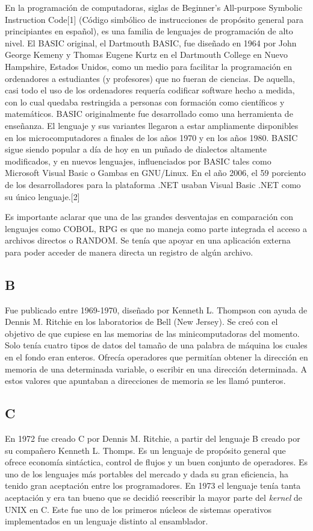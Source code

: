 \documentclass[twoside,twocolumn]{article}
\begin{document}
En la programación de computadoras, siglas de Beginner's All-purpose Symbolic Instruction Code[1] (Código simbólico de instrucciones de propósito general para principiantes en español), es una familia de lenguajes de programación de alto nivel. El BASIC original, el Dartmouth BASIC, fue diseñado en 1964 por John George Kemeny y Thomas Eugene Kurtz en el Dartmouth College en Nuevo Hampshire, Estados Unidos, como un medio para facilitar la programación en ordenadores a estudiantes (y profesores) que no fueran de ciencias. De aquella, casi todo el uso de los ordenadores requería codificar software hecho a medida, con lo cual quedaba restringida a personas con formación como científicos y matemáticos. BASIC originalmente fue desarrollado como una herramienta de enseñanza. El lenguaje y sus variantes llegaron a estar ampliamente disponibles en los microcomputadores a finales de los años 1970 y en los años 1980. BASIC sigue siendo popular a día de hoy en un puñado de dialectos altamente modificados, y en nuevos lenguajes, influenciados por BASIC tales como Microsoft Visual Basic o Gambas en GNU/Linux. En el año 2006, el 59 porciento de los desarrolladores para la plataforma .NET usaban Visual Basic .NET como su único lenguaje.[2]

Es importante aclarar que una de las grandes desventajas en comparación con lenguajes como COBOL, RPG es que no maneja como parte integrada el acceso a archivos directos o RANDOM. Se tenía que apoyar en una aplicación externa para poder acceder de manera directa un registro de algún archivo.

\subsection{B}
Fue publicado entre 1969-1970, diseñado por Kenneth L. Thompson con ayuda de Dennis M. Ritchie en los laboratorios de Bell (New Jersey). Se creó con el objetivo de que cupiese en las memorias de las minicomputadoras del momento. Solo tenía cuatro tipos de datos del tamaño de una palabra de máquina los cuales en el fondo eran enteros. Ofrecía operadores que permitían obtener la dirección en memoria de una determinada variable, o escribir en una dirección determinada. A estos valores que apuntaban a direcciones de memoria se les llamó punteros.

\subsection{C}
En 1972 fue creado C por Dennis M. Ritchie, a partir del lenguaje B creado por su compañero Kenneth L. Thomps. Es un lenguaje de propósito general que ofrece economía sintáctica, control de flujos y un buen conjunto de operadores. Es uno de los lenguajes más portables del mercado y dada su gran eficiencia, ha tenido gran aceptación entre los programadores. En 1973 el lenguaje tenía tanta aceptación y era tan bueno que se decidió reescribir la mayor parte del \textit{kernel} de UNIX en C. Este fue uno de los primeros núcleos de sistemas operativos implementados en un lenguaje distinto al ensamblador.
\end{document}
